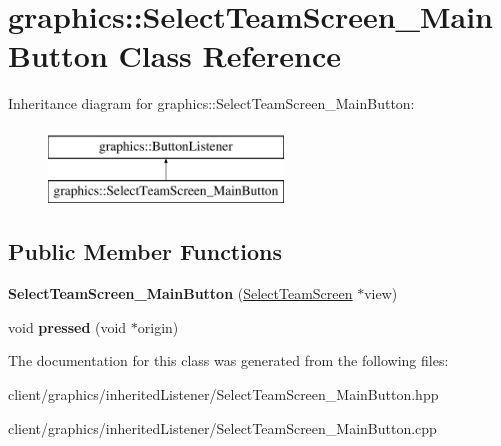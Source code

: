 \hypertarget{classgraphics_1_1_select_team_screen___main_button}{\section{graphics\-:\-:Select\-Team\-Screen\-\_\-\-Main\-Button Class Reference}
\label{classgraphics_1_1_select_team_screen___main_button}
}
Inheritance diagram for graphics\-:\-:Select\-Team\-Screen\-\_\-\-Main\-Button\-:\begin{figure}[H]
\begin{center}
\leavevmode
\includegraphics[height=2.000000cm]{classgraphics_1_1_select_team_screen___main_button}
\end{center}
\end{figure}
\subsection*{Public Member Functions}
\begin{DoxyCompactItemize}
\item 
\hypertarget{classgraphics_1_1_select_team_screen___main_button_a121b8f4582b6ebe4e3eb756afb60bed8}{{\bfseries Select\-Team\-Screen\-\_\-\-Main\-Button} (\hyperlink{classgraphics_1_1_select_team_screen}{Select\-Team\-Screen} $\ast$view)}\label{classgraphics_1_1_select_team_screen___main_button_a121b8f4582b6ebe4e3eb756afb60bed8}

\item 
\hypertarget{classgraphics_1_1_select_team_screen___main_button_acd78db510f4c6aefe910976108bab260}{void {\bfseries pressed} (void $\ast$origin)}\label{classgraphics_1_1_select_team_screen___main_button_acd78db510f4c6aefe910976108bab260}

\end{DoxyCompactItemize}


The documentation for this class was generated from the following files\-:\begin{DoxyCompactItemize}
\item 
client/graphics/inherited\-Listener/Select\-Team\-Screen\-\_\-\-Main\-Button.\-hpp\item 
client/graphics/inherited\-Listener/Select\-Team\-Screen\-\_\-\-Main\-Button.\-cpp\end{DoxyCompactItemize}

